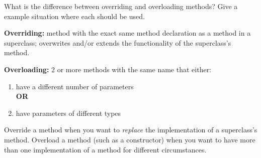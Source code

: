 What is the difference between overriding and overloading methods?  Give a example situation where each should be used. \\
\begin{answer}
\textbf{Overriding:} method with the exact same method declaration as a method in a superclass; overwrites and/or extends the functionality of the superclass's method.

\textbf{Overloading:} 2 or more methods with the same name that either:
	\begin{enumerate}
	\item have a different number of parameters\\ \textbf{OR}
	\item have parameters of different types
	\end{enumerate}
Override a method when you want to \textit{replace} the implementation of a superclass's method.  Overload a method (such as a constructor) when you want to have more than one implementation of a method for different circumstances.
\end{answer}

